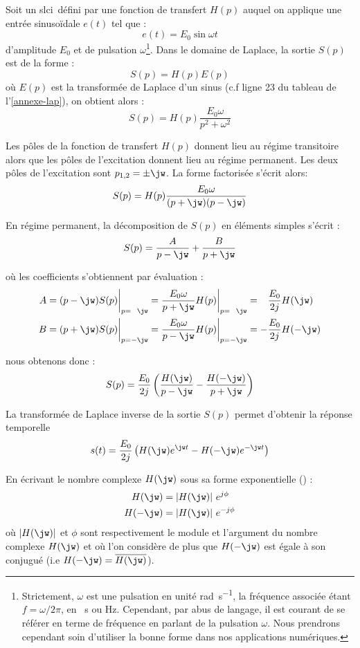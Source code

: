 Soit un \gls{slci}~défini par une fonction de transfert $H(p)$ auquel on applique 
une entrée sinuso\"idale $e(t)$ tel que :
$$
e(t)=E_0\sin\omega t 
$$
d'amplitude $E_0$ et de pulsation $\omega$\footnote{Strictement, $\omega$ est une 
pulsation en unité \si{\radian\per\second}, la fréquence associée étant $f=\omega/2\pi$, 
en \si{\per\second} ou \si{\hertz}. Cependant, 
par abus de langage, il est courant de se référer en terme de fréquence en parlant de la pulsation $\omega$. 
Nous prendrons cependant soin d'utiliser la bonne forme dans nos applications numériques.}.
Dans le domaine de Laplace, la sortie $S(p)$ est de la forme :
$$
S(p)=H(p)E(p)
$$
où $E(p)$ est la transformée de Laplace d'un sinus (c.f ligne 23 du tableau de l'\cref{annexe-lap}), 
on obtient alors :
$$
S(p)=H(p)\dfrac{E_0\omega}{p^2+\omega^2}
$$

Les pôles de la fonction de transfert $H(p)$ donnent lieu au 
régime transitoire alors que les pôles de l'excitation donnent 
lieu au régime permanent. 
Les deux pôles de l'excitation sont $p_{1,2}=\pm\jw$. La forme factorisée s'écrit alors:
$$
S(p)=H(p)\dfrac{E_0\omega}{(p+\jw)(p-\jw)}
$$

En régime permanent, la décomposition de $S(p)$ en éléments simples s'écrit :
$$
S(p)=\dfrac{A}{p-\jw} + \dfrac{B}{p+\jw}
$$

où les coefficients s'obtiennent par évaluation :
\begin{align*}
    A&=(p-\jw)S(p)\bigg|_{p=\hphantom{-}\jw} =\dfrac{E_0\omega}{p+\jw}H(p)\bigg|_{p=\hphantom{-}\jw} =\hphantom{-}\dfrac{E_0}{2j}H(\jw)\\
    B&=(p+\jw)S(p)\bigg|_{p=-\jw}=\dfrac{E_0\omega}{p-\jw}H(p)\bigg|_{p=-\jw}=-\dfrac{E_0}{2j}H(-\jw)
\end{align*}

nous obtenons donc :
$$
S(p)=\dfrac{E_0}{2j}\left(\dfrac{H(\jw)}{p-\jw}-\dfrac{H(-\jw)}{p+\jw} \right)
$$

La transformée de Laplace inverse de la sortie $S(p)$ permet d'obtenir la réponse temporelle 
$$
s(t)=\dfrac{E_0}{2j}\left(H(\jw)e^{\jw t}-H(-\jw)e^{-\jw t}\right)
$$

En écrivant le nombre complexe $H(\jw)$ sous sa forme exponentielle () :
\begin{align*}
    H(\jw)  &= |H(\jw)| e^{j\phi} \\
    H(-\jw) &= |H(\jw)| e^{-j\phi}
\end{align*}
où $|H(\jw)|$ et $\phi$ sont respectivement le module et l'argument du nombre complexe $H(\jw)$ 
et où l'on considère de plus que $H(-\jw)$ est égale à son conjugué (i.e $H(-\jw)=\overline{H(\jw)}$).

